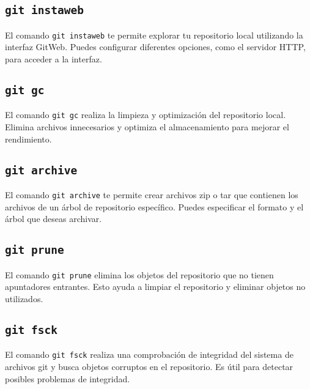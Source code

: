 \documentclass[
  letterpaper,
  DIV=11,
  numbers=noendperiod]{scrartcl}
\begin{document}
\hypertarget{git-instaweb}{%
\subsection{\texorpdfstring{\texttt{git\ instaweb}}{git instaweb}}\label{git-instaweb}}

El comando \texttt{git\ instaweb} te permite explorar tu repositorio
local utilizando la interfaz GitWeb. Puedes configurar diferentes
opciones, como el servidor HTTP, para acceder a la interfaz.

\hypertarget{git-gc}{%
\subsection{\texorpdfstring{\texttt{git\ gc}}{git gc}}\label{git-gc}}

El comando \texttt{git\ gc} realiza la limpieza y optimización del
repositorio local. Elimina archivos innecesarios y optimiza el
almacenamiento para mejorar el rendimiento.

\hypertarget{git-archive}{%
\subsection{\texorpdfstring{\texttt{git\ archive}}{git archive}}\label{git-archive}}

El comando \texttt{git\ archive} te permite crear archivos zip o tar que
contienen los archivos de un árbol de repositorio específico. Puedes
especificar el formato y el árbol que deseas archivar.

\hypertarget{git-prune}{%
\subsection{\texorpdfstring{\texttt{git\ prune}}{git prune}}\label{git-prune}}

El comando \texttt{git\ prune} elimina los objetos del repositorio que
no tienen apuntadores entrantes. Esto ayuda a limpiar el repositorio y
eliminar objetos no utilizados.

\hypertarget{git-fsck}{%
\subsection{\texorpdfstring{\texttt{git\ fsck}}{git fsck}}\label{git-fsck}}

El comando \texttt{git\ fsck} realiza una comprobación de integridad del
sistema de archivos git y busca objetos corruptos en el repositorio. Es
útil para detectar posibles problemas de integridad.
\end{document}
